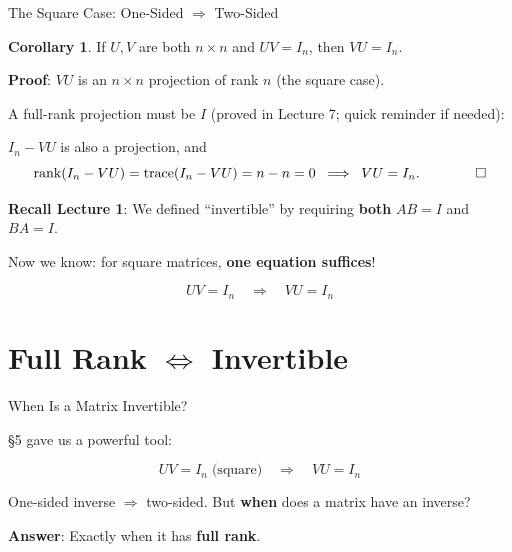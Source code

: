 \documentclass[10pt]{beamer}
\theoremstyle{definition}
\newtheorem{cor}{Corollary}[section]
\newcommand{\x}[1]{\alert{\textbf{#1}}}
\begin{document}
\begin{frame}{The Square Case: One-Sided $\Rightarrow$ Two-Sided}

\begin{cor}
If $U, V$ are both $n \times n$ and $UV = I_n$, then $VU = I_n$.
\end{cor}

\textbf{Proof}: $VU$ is an $n \times n$ projection of rank $n$ (the square case).

A full-rank projection must be $I$ (proved in Lecture 7; quick reminder if needed):

$I_n - VU$ is also a projection, and
$$\operatorname{rank}(I_n - VU) = \operatorname{trace}(I_n - VU) = n - n = 0 \;\;\Longrightarrow\;\; VU = I_n. \qquad\qed$$

\vspace{0.3em}

\x{Recall Lecture 1}: We defined ``invertible'' by requiring \x{both} $AB = I$ and $BA = I$.

Now we know: for square matrices, \x{one equation suffices}!

$$UV = I_n \quad\Longrightarrow\quad VU = I_n$$

\end{frame}

\section{Full Rank $\iff$ Invertible}

\begin{frame}{When Is a Matrix Invertible?}

\S5 gave us a powerful tool:

$$UV = I_n \;\text{(square)} \quad\Longrightarrow\quad VU = I_n$$

One-sided inverse $\Rightarrow$ two-sided. \quad But \x{when} does a matrix have an inverse?

\vspace{0.5em}

\x{Answer}: Exactly when it has \x{full rank}.

\end{frame}
\end{document}
